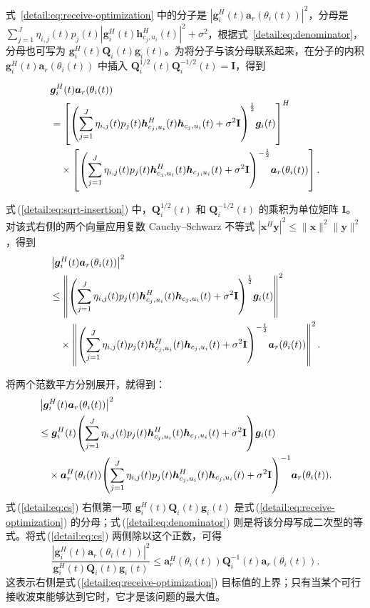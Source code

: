 \documentclass[11pt,a4paper]{ctexart}
\begin{document}
式~\eqref{detail:eq:receive-optimization} 中的分子是 $|\bm g_i^H(t)\bm a_r(\theta_i(t))|^2$，分母是 $\sum_{j=1}^{J}\eta_{i,j}(t)p_j(t)|\bm g_i^H(t)\bm h_{c_j,u_i}^H(t)|^2+\sigma^2$，根据式~\eqref{detail:eq:denominator}，分母也可写为 $\bm g_i^H(t)\mathbf Q_i(t)\bm g_i(t)$。为将分子与该分母联系起来，在分子的内积 $\bm g_i^H(t)\bm a_r(\theta_i(t))$ 中插入 $\mathbf Q_i^{1/2}(t)\mathbf Q_i^{-1/2}(t)=\mathbf I$，得到
\begin{samepage}
\begin{align}\label{detail:eq:sqrt-insertion}
&\bm g_i^H(t)\bm a_r(\theta_i(t))\notag\\
&=\left[\left(\sum_{j=1}^J\eta_{i,j}(t)p_j(t)
\bm h_{c_j,u_i}^{H}(t)\bm h_{c_j,u_i}(t)+\sigma^2\mathbf I\right)^{\frac12}\!\bm g_i(t)\right]^H\notag\\
&\quad\times\left[\left(\sum_{j=1}^J\eta_{i,j}(t)p_j(t)
\bm h_{c_j,u_i}^{H}(t)\bm h_{c_j,u_i}(t)+\sigma^2\mathbf I\right)^{-\frac12}\!\bm a_r(\theta_i(t))\right].
\end{align}
\end{samepage}
\begin{samepage}
式\,(\ref{detail:eq:sqrt-insertion}) 中，$\mathbf Q_i^{1/2}(t)$ 和 $\mathbf Q_i^{-1/2}(t)$ 的乘积为单位矩阵 $\mathbf I$。对该式右侧的两个向量应用复数 Cauchy--Schwarz 不等式 $|\bm x^H\bm y|^2\le\|\bm x\|^2\|\bm y\|^2$，得到
\begin{align}\label{detail:eq:cs-norms}
&\left|\bm g_i^H(t)\bm a_r(\theta_i(t))\right|^2\notag\\
&\le\left\|\left(\sum_{j=1}^J\eta_{i,j}(t)p_j(t)
\bm h_{c_j,u_i}^{H}(t)\bm h_{c_j,u_i}(t)+\sigma^2\mathbf I\right)^{\frac12}\!\bm g_i(t)\right\|^2\notag\\
&\quad\times\left\|\left(\sum_{j=1}^J\eta_{i,j}(t)p_j(t)
\bm h_{c_j,u_i}^{H}(t)\bm h_{c_j,u_i}(t)+\sigma^2\mathbf I\right)^{-\frac12}\!\bm a_r(\theta_i(t))\right\|^2.
\end{align}
\end{samepage}
将两个范数平方分别展开，就得到：
\begin{align}
&\left|\bm g_i^H(t)\bm a_r(\theta_i(t))\right|^2\notag\\
&\le\bm g_i^H(t)\!\left(\sum_{j=1}^J\eta_{i,j}(t)p_j(t)
\bm h_{c_j,u_i}^{H}(t)\bm h_{c_j,u_i}(t)+\sigma^2\mathbf I\right)\!\bm g_i(t)\notag\\
&\quad\times\bm a_r^H(\theta_i(t))\!\left(\sum_{j=1}^J\eta_{i,j}(t)p_j(t)
\bm h_{c_j,u_i}^{H}(t)\bm h_{c_j,u_i}(t)+\sigma^2\mathbf I\right)^{-1}\!\bm a_r(\theta_i(t)).\label{detail:eq:cs}
\end{align}
式\,(\ref{detail:eq:cs}) 右侧第一项 $\bm g_i^H(t)\mathbf Q_i(t)\bm g_i(t)$ 是式\,(\ref{detail:eq:receive-optimization}) 的分母；式\,(\ref{detail:eq:denominator}) 则是将该分母写成二次型的等式。将式\,(\ref{detail:eq:cs}) 两侧除以这个正数，可得
\begin{equation}\label{detail:eq:upper-bound}
\frac{|\bm g_i^H(t)\bm a_r(\theta_i(t))|^2}{\bm g_i^H(t)\mathbf Q_i(t)\bm g_i(t)}
\le\bm a_r^H(\theta_i(t))\mathbf Q_i^{-1}(t)\bm a_r(\theta_i(t)).
\end{equation}
这表示右侧是式\,(\ref{detail:eq:receive-optimization}) 目标值的上界；只有当某个可行接收波束能够达到它时，它才是该问题的最大值。
\end{document}
